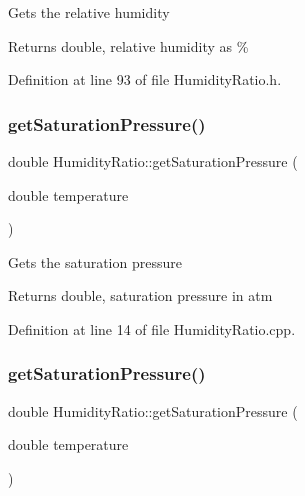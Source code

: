 Gets the relative humidity

\begin{DoxyReturn}{Returns}
double, relative humidity as \% 
\end{DoxyReturn}


Definition at line 93 of file Humidity\+Ratio.\+h.

\mbox{\label{class_humidity_ratio_a29d3152c2f14fd47f9ee34c0787049cf}} 
\subsubsection{\texorpdfstring{get\+Saturation\+Pressure()}{getSaturationPressure()}\hspace{0.1cm}{\footnotesize\ttfamily [1/3]}}
{\footnotesize\ttfamily double Humidity\+Ratio\+::get\+Saturation\+Pressure (\begin{DoxyParamCaption}\item[{double}]{temperature }\end{DoxyParamCaption})}

Gets the saturation pressure

\begin{DoxyReturn}{Returns}
double, saturation pressure in atm 
\end{DoxyReturn}


Definition at line 14 of file Humidity\+Ratio.\+cpp.

\mbox{\label{class_humidity_ratio_a29d3152c2f14fd47f9ee34c0787049cf}} 
\subsubsection{\texorpdfstring{get\+Saturation\+Pressure()}{getSaturationPressure()}\hspace{0.1cm}{\footnotesize\ttfamily [2/3]}}
{\footnotesize\ttfamily double Humidity\+Ratio\+::get\+Saturation\+Pressure (\begin{DoxyParamCaption}\item[{double}]{temperature }\end{DoxyParamCaption})}

